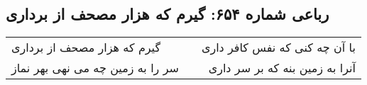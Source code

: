 \begin{center}
\section*{رباعی شماره ۶۵۴: گیرم که هزار مصحف از برداری}
\label{sec:sh654}
\begin{longtable}{l p{0.5cm} r}
گیرم که هزار مصحف از برداری
&&
با آن چه کنی که نفس کافر داری
\\
سر را به زمین چه می نهی بهر نماز
&&
آنرا به زمین بنه که بر سر داری
\\
\end{longtable}
\end{center}
